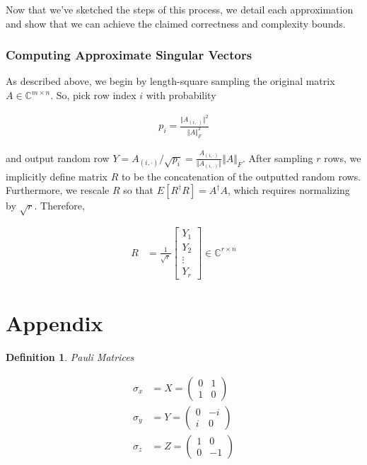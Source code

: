 \documentclass[11pt]{article}
\newcommand\0{\mathbf{0}}
\newcommand\CC{\mathbb{C}}
\newcommand\<{\langle}
\renewcommand\>{\rangle}
\newtheorem{definition}[theorem]{Definition}
\begin{document}
Now that we've sketched the steps of this process, we detail each approximation and show that we can achieve the claimed correctness and complexity bounds.

\subsubsection{Computing Approximate Singular Vectors}

As described above, we begin by length-square sampling the original matrix $A \in \CC^{m \times n }$. So, pick row index $i$ with probability

\begin{align*}
p_i = \frac{\Vert A_{(i, \cdot)}\Vert^2}{\Vert A \Vert_F^2} 	
\end{align*}

and output random row $Y = A_{(i, \cdot)} / \sqrt{p_i} = \frac{A_{(i, \cdot)}}{\Vert A_{(i, \cdot)}\Vert}\Vert A\Vert_F$. After sampling $r$ rows, we implicitly define matrix $R$ to be the concatenation of the outputted random rows. Furthermore, we rescale $R$ so that $E[R^{\dag} R] = A^\dag A$, which requires normalizing by $\sqrt{r}$. Therefore,

\begin{align*}
R &= \frac{1}{\sqrt{r}} \begin{bmatrix}
Y_1 \\
Y_2 \\
\vdots \\
Y_r
\end{bmatrix} \in \CC^{r \times n}
\end{align*}

\section{Appendix}

\begin{definition}
\label{pauli}
Pauli Matrices

\begin{align*}
\sigma_x &= X = \begin{pmatrix} 0 & 1 \\ 1 & 0\end{pmatrix} \\
\sigma_y &= Y = \begin{pmatrix} 0 & -i \\ i & 0\end{pmatrix}\\
\sigma_z &= Z = \begin{pmatrix} 1 & 0 \\ 0 & -1\end{pmatrix}
\end{align*}
\end{definition}
\end{document}
